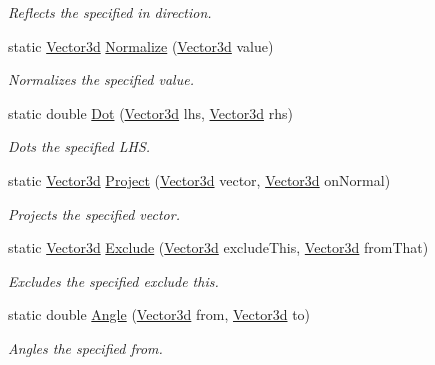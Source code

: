 \begin{DoxyCompactItemize}
\begin{DoxyCompactList}\small\item\em Reflects the specified in direction. \end{DoxyCompactList}\item 
static \hyperlink{struct_unity_engine_1_1_vector3d}{Vector3d} \hyperlink{struct_unity_engine_1_1_vector3d_a007c5bade10091de4c20e489431ce649}{Normalize} (\hyperlink{struct_unity_engine_1_1_vector3d}{Vector3d} value)
\begin{DoxyCompactList}\small\item\em Normalizes the specified value. \end{DoxyCompactList}\item 
static double \hyperlink{struct_unity_engine_1_1_vector3d_a1c742f5fd820a524c50f519fec2a20ba}{Dot} (\hyperlink{struct_unity_engine_1_1_vector3d}{Vector3d} lhs, \hyperlink{struct_unity_engine_1_1_vector3d}{Vector3d} rhs)
\begin{DoxyCompactList}\small\item\em Dots the specified L\+HS. \end{DoxyCompactList}\item 
static \hyperlink{struct_unity_engine_1_1_vector3d}{Vector3d} \hyperlink{struct_unity_engine_1_1_vector3d_afc3abae39968f726fa67005bb0fce7fc}{Project} (\hyperlink{struct_unity_engine_1_1_vector3d}{Vector3d} vector, \hyperlink{struct_unity_engine_1_1_vector3d}{Vector3d} on\+Normal)
\begin{DoxyCompactList}\small\item\em Projects the specified vector. \end{DoxyCompactList}\item 
static \hyperlink{struct_unity_engine_1_1_vector3d}{Vector3d} \hyperlink{struct_unity_engine_1_1_vector3d_a263b1eb55f5d6532b12a626bc3d71de2}{Exclude} (\hyperlink{struct_unity_engine_1_1_vector3d}{Vector3d} exclude\+This, \hyperlink{struct_unity_engine_1_1_vector3d}{Vector3d} from\+That)
\begin{DoxyCompactList}\small\item\em Excludes the specified exclude this. \end{DoxyCompactList}\item 
static double \hyperlink{struct_unity_engine_1_1_vector3d_a702768ab20d952a18dd33b3562df9cb6}{Angle} (\hyperlink{struct_unity_engine_1_1_vector3d}{Vector3d} from, \hyperlink{struct_unity_engine_1_1_vector3d}{Vector3d} to)
\begin{DoxyCompactList}\small\item\em Angles the specified from. \end{DoxyCompactList}\item 

\end{DoxyCompactItemize}
